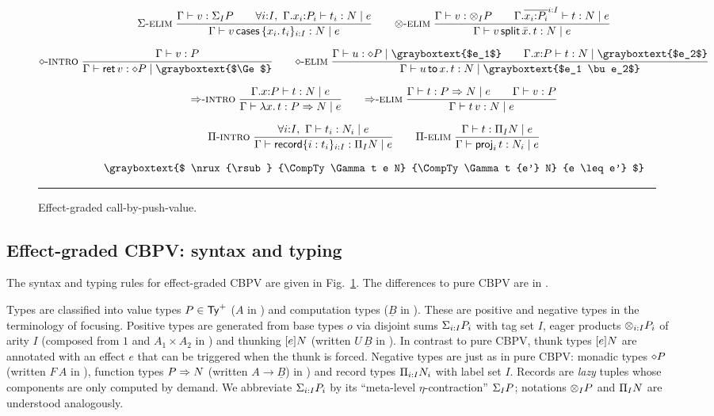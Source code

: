 \documentclass[acmsmall,review,anonymous]{acmart}\settopmatter{printfolios=true,printccs=false,printacmref=false}
\newcommand{\graybox}[1]{\grayboxtext{$#1$}}
\begin{document}
\begin{figure}[htbp]
\begin{gather*}
\\[1.5ex]
 \nru{\relim\GS}
     {\ValTy \Gamma v {\sumt I P} \qquad
      \forall i{:}I,\ \CompTy {\ext \Gamma {x_i} {P_i}} {t_i} e N
    }{\CompTy \Gamma {\caser v {\{x_i.\, t_i\}_{i:I}}} e N}
\qquad
 \nru{\relim\otimes}
     {\ValTy \Gamma v {\tupt I P} \qquad
      \CompTy {\extr \Gamma {\overline{x_i{:}P_i}^{i:I}}} t e N
    }{\CompTy \Gamma {\splits v {\bar x} t} e N}
\\[1.5ex]
 \nru{\rintro\diamond}
     {\ValTy \Gamma v P
    }{\CompTy \Gamma {\ret v} {\graybox \Ge} {\compty P}}
\qquad
 \nru{\relim\diamond}
     {\CompTy \Gamma u {\graybox{e_1}} {\compty P} \qquad
      \CompTy {\ext \Gamma x P} t {\graybox{e_2}} N
    }{\CompTy \Gamma {\bind x u t} {\graybox{e_1 \bu e_2}} N}
\\[1.5ex]
 \nru{\rintro\To}
     {\CompTy {\ext \Gamma x P} t e N
    }{\CompTy \Gamma {\lam x t} e {P \To N}}
\qquad
 \nru{\relim\To}
     {\CompTy \Gamma t e {P \To N} \qquad
      \ValTy \Gamma v P
    }{\CompTy \Gamma {\app t v} e N}
\\[1.5ex]
 \nru{\rintro\Pi}
     {\forall i{:}I,\ \CompTy \Gamma {t_i} e {N_i}
    }{\CompTy \Gamma {\trecord {\{i : t_i\}_{i:I}}} e {\rect I N}}
\qquad
 \nru{\relim\Pi}
     {\CompTy \Gamma t e {\rect I N}
    }{\CompTy \Gamma {\proj i t} e  {N_i}}
\\[1.5ex]
\graybox{
 \nrux{\rsub}
      {\CompTy \Gamma t e N}
      {\CompTy \Gamma t {e'} N}
      {e \leq e'}
}
\end{gather*}
\rule{\textwidth}{0.2pt}
  \caption{Effect-graded call-by-push-value.}
  \label{fig:cbpv}
\end{figure}

\subsection{Effect-graded CBPV: syntax and typing}

The syntax and typing rules for effect-graded CBPV are given in
Fig.~\ref{fig:cbpv}.  The differences to pure CBPV are in
\graybox{\mbox{gray boxes}}.

Types are classified into value types $P \in \mathsf{Ty}^{+}$ ($A$ in
\citet{levy:hosc06}) and computation types ($\underline B$ in
\loccit).  These are positive and negative types in the terminology of
focusing.  Positive types are generated from base types $o$ via
disjoint sums $\Sigma_{i:I} P_{i}$ with tag set $I$, eager products $\otimes_{i:I} P_{i}$ of arity $I$ (composed
from $1$ and $A_1 \times A_2$ in \loccit) and thunking $[e]N$
(written $U\,\underline B$ in \loccit).  In contrast to pure CBPV,
thunk types $[e]N$ are annotated with an effect $e$ that can
be triggered when the thunk is forced.  Negative types are just as in
pure CBPV: monadic types $\diamond P$ (written $F\,A$ in \loccit),
function types $P \Rightarrow N$ (written $A \to \underline B$) in \loccit)
and record types $\Pi_{i:I} N_{i}$ with label set $I$.
Records are \emph{lazy} tuples whose components are only computed by demand.
We abbreviate $\Sigma_{i:I} P_{i}$ by its ``meta-level $\eta$-contraction''
$\Sigma_{I} P$; notations $\otimes_{I} P$ and
$\Pi_{I} N$ are understood analogously.
\end{document}
